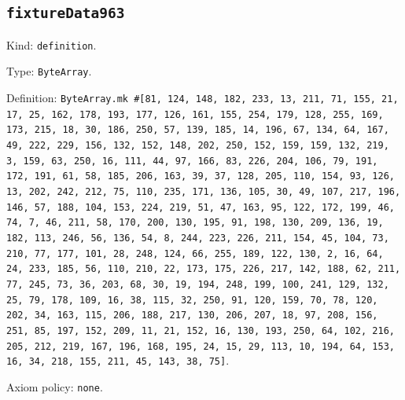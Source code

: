 \documentclass[11pt]{article}
\begin{document}
\subsection*{\texttt{fixtureData963}}
\noindent Kind: \texttt{definition}.\par
\noindent Type: \texttt{ByteArray}.\par
\noindent Definition: \texttt{ByteArray.mk \#[81, 124, 148, 182, 233, 13, 211, 71, 155, 21, 17, 25, 162, 178, 193, 177, 126, 161, 155, 254, 179, 128, 255, 169, 173, 215, 18, 30, 186, 250, 57, 139, 185, 14, 196, 67, 134, 64, 167, 49, 222, 229, 156, 132, 152, 148, 202, 250, 152, 159, 159, 132, 219, 3, 159, 63, 250, 16, 111, 44, 97, 166, 83, 226, 204, 106, 79, 191, 172, 191, 61, 58, 185, 206, 163, 39, 37, 128, 205, 110, 154, 93, 126, 13, 202, 242, 212, 75, 110, 235, 171, 136, 105, 30, 49, 107, 217, 196, 146, 57, 188, 104, 153, 224, 219, 51, 47, 163, 95, 122, 172, 199, 46, 74, 7, 46, 211, 58, 170, 200, 130, 195, 91, 198, 130, 209, 136, 19, 182, 113, 246, 56, 136, 54, 8, 244, 223, 226, 211, 154, 45, 104, 73, 210, 77, 177, 101, 28, 248, 124, 66, 255, 189, 122, 130, 2, 16, 64, 24, 233, 185, 56, 110, 210, 22, 173, 175, 226, 217, 142, 188, 62, 211, 77, 245, 73, 36, 203, 68, 30, 19, 194, 248, 199, 100, 241, 129, 132, 25, 79, 178, 109, 16, 38, 115, 32, 250, 91, 120, 159, 70, 78, 120, 202, 34, 163, 115, 206, 188, 217, 130, 206, 207, 18, 97, 208, 156, 251, 85, 197, 152, 209, 11, 21, 152, 16, 130, 193, 250, 64, 102, 216, 205, 212, 219, 167, 196, 168, 195, 24, 15, 29, 113, 10, 194, 64, 153, 16, 34, 218, 155, 211, 45, 143, 38, 75]}.\par
\noindent Axiom policy: \texttt{none}.\par
\end{document}
